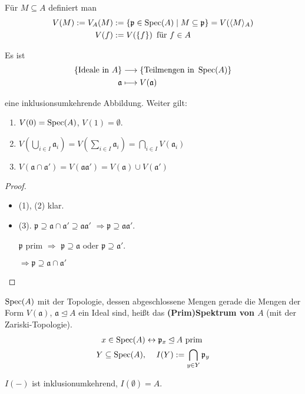 Für $M\subseteq A$ definiert man
\begin{align*}
  V(M) := V_{A}(M) & :=\{\mathfrak{p}\in\operatorname{Spec}(A)\mid M \subseteq \mathfrak{p} \}=V(\langle M\rangle_{A})\\
  V(f) & :=V(\{f\})\text{\, für }f\in A
\end{align*}

\begin{lem}
\label{lem:zariski-top-auf-spektrum}
Es ist
  \begin{align*}
    \{\text{Ideale in }A\} & \longrightarrow\text{\{Teilmengen in }\operatorname{Spec}(A)\}\\
    \mathfrak{a} & \longmapsto V(\mathfrak{a})
  \end{align*}

  eine inklusionsumkehrende Abbildung. Weiter gilt:
  \begin{enumerate}
  \item $V(0)=\operatorname{Spec}(A)$, $V(1)=\emptyset$.
  \item $V\left(\bigcup_{i\in
        I}\mathfrak{a}_{i}\right)=V\left(\sum_{i\in
        I}\mathfrak{a}_{i}\right)=\bigcap_{i\in I}V(\mathfrak{a}_{i})$
  \item
    $V(\mathfrak{a}\cap\mathfrak{a}')=V(\mathfrak{a}\mathfrak{a}')=V(\mathfrak{a})\cup
    V(\mathfrak{a}')$
  \end{enumerate}
\end{lem}
\begin{proof} \mbox{}
  \begin{itemize}
  \item (1), (2) klar.
  \item
    (3). $\mathfrak{p}\supseteq\mathfrak{a}\cap\mathfrak{a}'\supseteq\mathfrak{a}\mathfrak{a}'$ $\Rightarrow\mathfrak{p}\supseteq\mathfrak{a}\mathfrak{a}'$.

    $\mathfrak{p}$ prim $\Rightarrow$ $\mathfrak{p}\supseteq\mathfrak{a}$ oder
    $\mathfrak{p}\supseteq\mathfrak{a}'$.

    $\Rightarrow\mathfrak{p}\supseteq\mathfrak{a}\cap\mathfrak{a}'$

  \end{itemize}
\end{proof}
\begin{defn}
\label{def:spec-als-top-raum}	
$\operatorname{Spec}(A)$ mit der Topologie, dessen abgeschlossene Mengen
  gerade die Mengen der Form $V(\mathfrak{a})$,
  $\mathfrak{a}\unlhd A$ ein Ideal sind, heißt das \textbf{(Prim)Spektrum von $A$}
  (mit der Zariski-Topologie).
  \begin{align*}
    x\in\operatorname{Spec}(A) & \leftrightarrow\mathfrak{p}_{x}\unlhd A\text{ prim}\\
    Y\subseteq\operatorname{Spec}(A), & \phantom{\leftrightarrow\
                              }I(Y):=\bigcap_{y \in Y}\mathfrak{p}_{y}
  \end{align*}

  $I(-)$ ist inklusionumkehrend, $I(\emptyset)=A$.
\end{defn}
